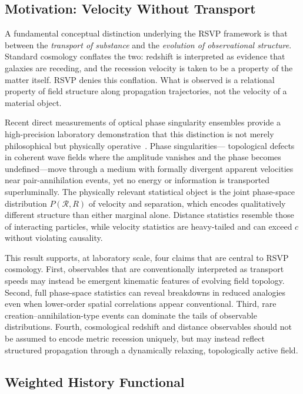 \documentclass[12pt,a4paper]{article}
\theoremstyle{remark}
\begin{document}
\subsection{Motivation: Velocity Without Transport}

A fundamental conceptual distinction underlying the RSVP framework is that
between the \emph{transport of substance} and the \emph{evolution of
observational structure}. Standard cosmology conflates the two: redshift is
interpreted as evidence that galaxies are receding, and the recession velocity
is taken to be a property of the matter itself. RSVP denies this
conflation. What is observed is a relational property of field structure along
propagation trajectories, not the velocity of a material object.

Recent direct measurements of optical phase singularity ensembles provide a
high-precision laboratory demonstration that this distinction is not merely
philosophical but physically operative~\cite{bucher2026}. Phase singularities---
topological defects in coherent wave fields where the amplitude vanishes and
the phase becomes undefined---move through a medium with formally divergent
apparent velocities near pair-annihilation events, yet no energy or information
is transported superluminally. The physically relevant statistical object is
the joint phase-space distribution $P(\mathcal{R}, R)$ of velocity and
separation, which encodes qualitatively different structure than either
marginal alone. Distance statistics resemble those of interacting particles,
while velocity statistics are heavy-tailed and can exceed $c$ without
violating causality.

This result supports, at laboratory scale, four claims that are central to
RSVP cosmology. First, observables that are conventionally interpreted as
transport speeds may instead be emergent kinematic features of evolving field
topology. Second, full phase-space statistics can reveal breakdowns in reduced
analogies even when lower-order spatial correlations appear conventional.
Third, rare creation--annihilation-type events can dominate the tails of
observable distributions. Fourth, cosmological redshift and distance observables
should not be assumed to encode metric recession uniquely, but may instead
reflect structured propagation through a dynamically relaxing, topologically
active field.

\subsection{Weighted History Functional}
\end{document}
